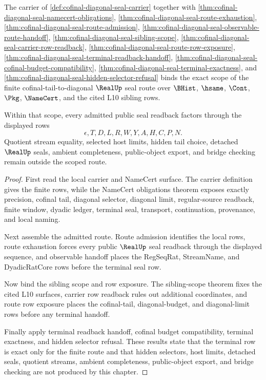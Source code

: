 \begin{theorem}
\label{thm:cofinal-diagonal-seal-scoped-route-closure}
The carrier of \autoref{def:cofinal-diagonal-seal-carrier} together with \autoref{thm:cofinal-diagonal-seal-namecert-obligations}, \autoref{thm:cofinal-diagonal-seal-route-exhaustion}, \autoref{thm:cofinal-diagonal-seal-route-admission}, \autoref{thm:cofinal-diagonal-seal-observable-route-handoff}, \autoref{thm:cofinal-diagonal-seal-sibling-scope}, \autoref{thm:cofinal-diagonal-seal-carrier-row-readback}, \autoref{thm:cofinal-diagonal-seal-route-row-exposure}, \autoref{thm:cofinal-diagonal-seal-terminal-readback-handoff}, \autoref{thm:cofinal-diagonal-seal-cofinal-budget-compatibility}, \autoref{thm:cofinal-diagonal-seal-terminal-exactness}, and \autoref{thm:cofinal-diagonal-seal-hidden-selector-refusal} binds the exact scope of the finite cofinal-tail-to-diagonal $\RealUp$ seal route over $\BHist$, $\hsame$, $\Cont$, $\Pkg$, $\NameCert$, and the cited L10 sibling rows.

Within that scope, every admitted public seal readback factors through the displayed rows
$$
\epsilon,T,D,L,R,W,Y,A,H,C,P,N.
$$
Quotient stream equality, selected host limits, hidden tail choice, detached $\RealUp$ seals, ambient completeness, public-object export, and bridge checking remain outside the scoped route.
\end{theorem}
\begin{proof}
First read the local carrier and NameCert surface. The carrier definition gives the finite rows, while the NameCert obligations theorem exposes exactly precision, cofinal tail, diagonal selector, diagonal limit, regular-source readback, finite window, dyadic ledger, terminal seal, transport, continuation, provenance, and local naming.

Next assemble the admitted route. Route admission identifies the local rows, route exhaustion forces every public $\RealUp$ seal readback through the displayed sequence, and observable handoff places the RegSeqRat, StreamName, and DyadicRatCore rows before the terminal seal row.

Now bind the sibling scope and row exposure. The sibling-scope theorem fixes the cited L10 surfaces, carrier row readback rules out additional coordinates, and route row exposure places the cofinal-tail, diagonal-budget, and diagonal-limit rows before any terminal handoff.

Finally apply terminal readback handoff, cofinal budget compatibility, terminal exactness, and hidden selector refusal. These results state that the terminal row is exact only for the finite route and that hidden selectors, host limits, detached seals, quotient streams, ambient completeness, public-object export, and bridge checking are not produced by this chapter.
\end{proof}

